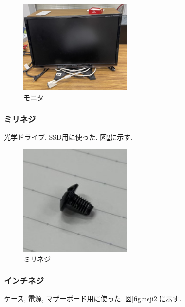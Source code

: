 \documentclass{ltjsarticle} %
\begin{document}
\begin{figure}[H] %
  \centering
  \includegraphics[width=0.5\textwidth]{monita.jpg} %
  \caption{モニタ} %
  \label{fig:monita} %
\end{figure}


\subsubsection{ミリネジ}
光学ドライブ, SSD用に使った. 図\ref{fig:neji1}に示す. 

\begin{figure}[H] %
  \centering
  \includegraphics[width=0.5\textwidth]{neji1.jpg} %
  \caption{ミリネジ} %
  \label{fig:neji1} %
\end{figure}


\subsubsection{インチネジ}
ケース, 電源, マザーボード⽤に使った. 図\ref{fig:neji2}に示す.
\end{document}
